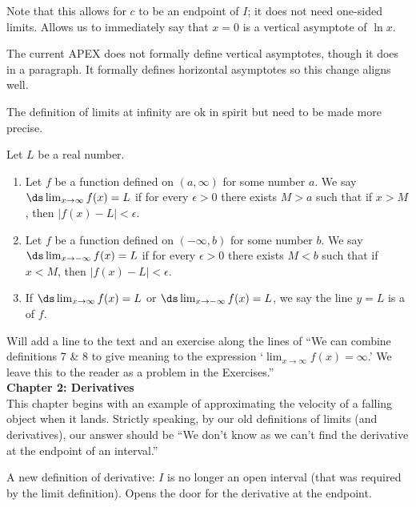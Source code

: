\documentclass{article}
\newcounter{chapter}
\begin{document}
Note that this allows for $c$ to be an endpoint of $I$; it does not need one-sided limits. Allows us to immediately say that $x=0$ is a vertical asymptote of $\ln x$.

The current APEX does not formally define vertical asymptotes, though it does in a paragraph. It formally defines horizontal asymptotes so this change aligns well.


The definition of limits at infinity are ok in spirit but need to be made more precise.

{Let $L$ be a real number.
\begin{enumerate}
\item Let $f$ be a function defined on $(a,\infty)$ for some number $a$. We say $\ds\lim_{x\rightarrow\infty} f(x)=L$ if for every $\epsilon>0$ there exists $M>a$ such that if $x > M$, then $|f(x)-L|<\epsilon$. \\

\item Let $f$ be a function defined on $(-\infty,b)$ for some number $b$. We say $\ds\lim_{x\rightarrow-\infty} f(x)=L$ if for every $\epsilon>0$ there exists $M<b$ such that if $x < M$, then $|f(x)-L|<\epsilon$. \\

 \item  If $\ds\lim_{x\rightarrow\infty} f(x)=L$ or $\ds\lim_{x\rightarrow-\infty} f(x)=L$, we say the line $y=L$ is a  of $f$.
\end{enumerate}
}
Will add a line to the text and an exercise along the lines of ``We can combine definitions 7 \& 8 to give meaning to the expression `$\lim_{x\to\infty}f(x) = \infty$.' We leave this to the reader as a problem in the Exercises.''\\

\noindent\large\textbf{Chapter 2: Derivatives}\normalsize\\

This chapter begins with an example of approximating the velocity of a falling object when it lands. Strictly speaking, by our old definitions of limits (and derivatives), our answer should be ``We don't know as we can't find the derivative at the endpoint of an interval.''

A new definition of derivative: $I$ is no longer an open interval (that was required by the limit definition). Opens the door for the derivative at the endpoint.
\end{document}
